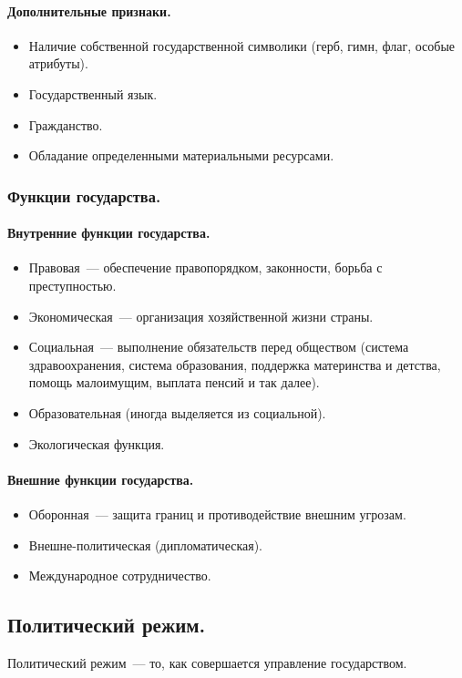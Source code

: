 \documentclass{article}
\begin{document}
	\paragraph{Дополнительные признаки.}
	\begin{itemize}
		\item Наличие собственной государственной символики (герб, гимн, флаг, особые атрибуты).
		\item Государственный язык.
		\item Гражданство.
		\item Обладание определенными материальными ресурсами.
	\end{itemize}
	\subsubsection{Функции государства.}
	\paragraph{Внутренние функции государства.}
	\begin{itemize}
		\item Правовая~--- обеспечение правопорядком, законности, борьба с преступностью.
		\item Экономическая~--- организация хозяйственной жизни страны.
		\item Социальная~--- выполнение обязательств перед обществом (система здравоохранения, система образования, поддержка материнства и детства, помощь малоимущим, выплата пенсий и так далее).
		\item Образовательная (иногда выделяется из социальной).
		\item Экологическая функция.
	\end{itemize}
	\paragraph{Внешние функции государства.}
	\begin{itemize}
		\item Оборонная~--- защита границ и противодействие внешним угрозам.
		\item Внешне-политическая (дипломатическая).
		\item Международное сотрудничество.
	\end{itemize}
	\subsection{Политический режим.}
	\begin{definition}
		Политический режим~--- то, как совершается управление государством.
	\end{definition}
\end{document}
